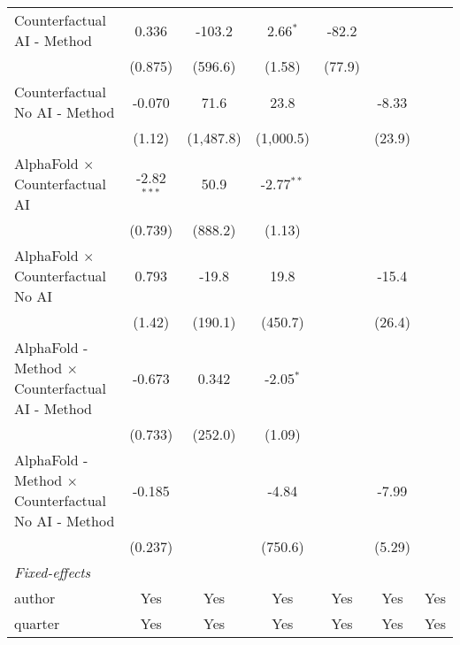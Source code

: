 \begin{tabular}{lcccccc}
   Counterfactual AI - Method                                 & 0.336         & -103.2    & 2.66$^{*}$   & -82.2        &               &   \\   
                                                              & (0.875)       & (596.6)   & (1.58)       & (77.9)       &               &   \\   
   Counterfactual No AI - Method                              & -0.070        & 71.6      & 23.8         &              & -8.33         &   \\   
                                                              & (1.12)        & (1,487.8) & (1,000.5)    &              & (23.9)        &   \\   
   AlphaFold $\times$ Counterfactual AI                       & -2.82$^{***}$ & 50.9      & -2.77$^{**}$ &              &               &   \\   
                                                              & (0.739)       & (888.2)   & (1.13)       &              &               &   \\   
   AlphaFold $\times$ Counterfactual No AI                    & 0.793         & -19.8     & 19.8         &              & -15.4         &   \\   
                                                              & (1.42)        & (190.1)   & (450.7)      &              & (26.4)        &   \\   
   AlphaFold - Method $\times$ Counterfactual AI - Method     & -0.673        & 0.342     & -2.05$^{*}$  &              &               &   \\   
                                                              & (0.733)       & (252.0)   & (1.09)       &              &               &   \\   
   AlphaFold - Method $\times$ Counterfactual No AI - Method  & -0.185        &           & -4.84        &              & -7.99         &   \\   
                                                              & (0.237)       &           & (750.6)      &              & (5.29)        &   \\   
   \midrule
   \emph{Fixed-effects}\\
   author                                                     & Yes           & Yes       & Yes          & Yes          & Yes           & Yes\\  
   quarter                                                    & Yes           & Yes       & Yes          & Yes          & Yes           & Yes\\  

\end{tabular}
